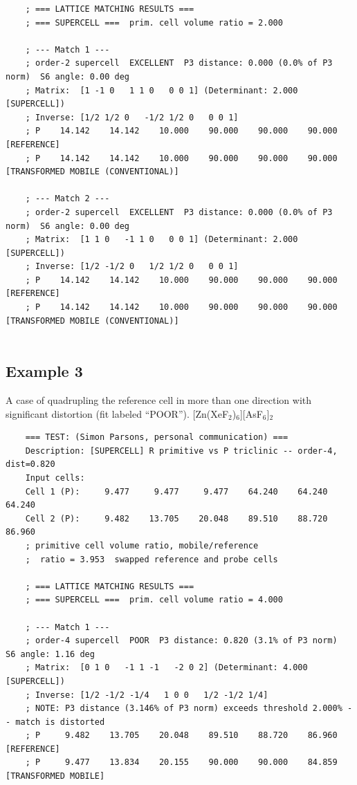 \documentclass[preprint]{iucr}              %
\numberwithin{equation}{section}
\begin{document}
{\begin{verbatim}
	; === LATTICE MATCHING RESULTS ===
	; === SUPERCELL ===  prim. cell volume ratio = 2.000
	
	; --- Match 1 ---
	; order-2 supercell  EXCELLENT  P3 distance: 0.000 (0.0% of P3 norm)  S6 angle: 0.00 deg
	; Matrix:  [1 -1 0   1 1 0   0 0 1] (Determinant: 2.000  [SUPERCELL])
	; Inverse: [1/2 1/2 0   -1/2 1/2 0   0 0 1]
	; P    14.142    14.142    10.000    90.000    90.000    90.000  [REFERENCE]
	; P    14.142    14.142    10.000    90.000    90.000    90.000  [TRANSFORMED MOBILE (CONVENTIONAL)]
	
	; --- Match 2 ---
	; order-2 supercell  EXCELLENT  P3 distance: 0.000 (0.0% of P3 norm)  S6 angle: 0.00 deg
	; Matrix:  [1 1 0   -1 1 0   0 0 1] (Determinant: 2.000  [SUPERCELL])
	; Inverse: [1/2 -1/2 0   1/2 1/2 0   0 0 1]
	; P    14.142    14.142    10.000    90.000    90.000    90.000  [REFERENCE]
	; P    14.142    14.142    10.000    90.000    90.000    90.000  [TRANSFORMED MOBILE (CONVENTIONAL)]
	
\end{verbatim}

\subsection{Example 3}
A case of quadrupling the reference cell in more than
one direction with significant distortion (fit labeled
``POOR'').
[Zn(XeF$_2$)$_6$][AsF$_6$]$_2$ \cite{clough2026phase}

\begin{verbatim}
	=== TEST: (Simon Parsons, personal communication) ===
	Description: [SUPERCELL] R primitive vs P triclinic -- order-4, dist=0.820
	Input cells:
	Cell 1 (P):     9.477     9.477     9.477    64.240    64.240    64.240 
	Cell 2 (P):     9.482    13.705    20.048    89.510    88.720    86.960 
	; primitive cell volume ratio, mobile/reference
	;  ratio = 3.953  swapped reference and probe cells
	
	; === LATTICE MATCHING RESULTS ===
	; === SUPERCELL ===  prim. cell volume ratio = 4.000
	
	; --- Match 1 ---
	; order-4 supercell  POOR  P3 distance: 0.820 (3.1% of P3 norm)  S6 angle: 1.16 deg
	; Matrix:  [0 1 0   -1 1 -1   -2 0 2] (Determinant: 4.000  [SUPERCELL])
	; Inverse: [1/2 -1/2 -1/4   1 0 0   1/2 -1/2 1/4]
	; NOTE: P3 distance (3.146% of P3 norm) exceeds threshold 2.000% -- match is distorted
	; P     9.482    13.705    20.048    89.510    88.720    86.960  [REFERENCE]
	; P     9.477    13.834    20.155    90.000    90.000    84.859  [TRANSFORMED MOBILE]
	


\end{verbatim}}
\end{document}
